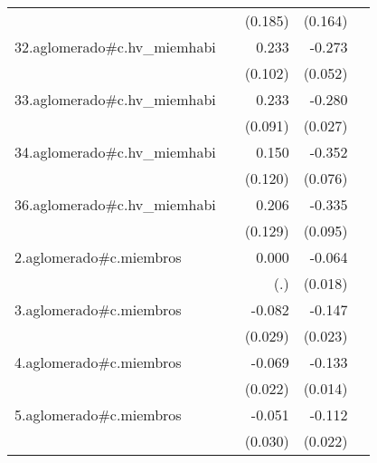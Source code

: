 {\begin{longtable}{l*{4}{D{.}{.}{-1}}}
            &                     &     (0.185)         &     (0.164)         &                     \\
\addlinespace
32.aglomerado#c.hv\_miemhabi&                     &       0.233\sym{*}  &      -0.273\sym{***}&                     \\
            &                     &     (0.102)         &     (0.052)         &                     \\
\addlinespace
33.aglomerado#c.hv\_miemhabi&                     &       0.233\sym{*}  &      -0.280\sym{***}&                     \\
            &                     &     (0.091)         &     (0.027)         &                     \\
\addlinespace
34.aglomerado#c.hv\_miemhabi&                     &       0.150         &      -0.352\sym{***}&                     \\
            &                     &     (0.120)         &     (0.076)         &                     \\
\addlinespace
36.aglomerado#c.hv\_miemhabi&                     &       0.206         &      -0.335\sym{***}&                     \\
            &                     &     (0.129)         &     (0.095)         &                     \\
\addlinespace
2.aglomerado#c.miembros&                     &       0.000         &      -0.064\sym{***}&                     \\
            &                     &         (.)         &     (0.018)         &                     \\
\addlinespace
3.aglomerado#c.miembros&                     &      -0.082\sym{**} &      -0.147\sym{***}&                     \\
            &                     &     (0.029)         &     (0.023)         &                     \\
\addlinespace
4.aglomerado#c.miembros&                     &      -0.069\sym{**} &      -0.133\sym{***}&                     \\
            &                     &     (0.022)         &     (0.014)         &                     \\
\addlinespace
5.aglomerado#c.miembros&                     &      -0.051         &      -0.112\sym{***}&                     \\
            &                     &     (0.030)         &     (0.022)         &                     \\

\end{longtable}}
